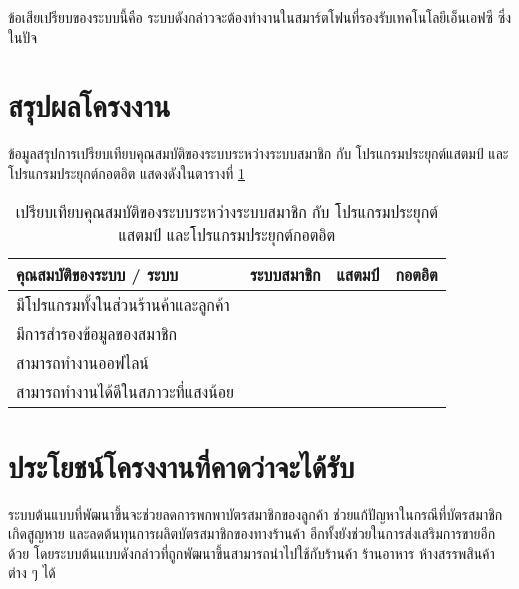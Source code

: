 \documentclass[a4paper]{article}
\newcommand{\cmark}{\ding{51}}
\newcommand{\xmark}{\ding{55}}
\begin{document}
ข้อเสียเปรียบของระบบนี้คือ ระบบดังกล่าวจะต้องทำงานในสมาร์ตโฟนที่รองรับเทคโนโลยีเอ็นเอฟซี ซึ่งในปัจ
\section{สรุปผลโครงงาน}
ข้อมูลสรุปการเปรียบเทียบคุณสมบัติของระบบระหว่างระบบสมาชิก กับ โปรแกรมประยุกต์แสตมป์ และโปรแกรมประยุกต์กอตอิต แสดงดังในตารางที่ \ref{tab:compare_feature}

\begin{table}[ht!]
\centering
\resizebox{81mm}{!} {
\begin{tabular}{ | l | c | c | c |}
	\hline                        
  	คุณสมบัติของระบบ / ระบบ            	& ระบบสมาชิก & แสตมป์ & กอตอิต \\
  	\hline 
  	มีโปรแกรมทั้งในส่วนร้านค้าและลูกค้า 	& \cmark & \xmark & \xmark \\
  	\hline
  	มีการสำรองข้อมูลของสมาชิก			& \cmark & \cmark & \cmark \\
  	\hline
  	สามารถทำงานออฟไลน์                 	& \cmark & \cmark & \cmark \\
  	\hline
  	สามารถทำงานได้ดีในสภาวะที่แสงน้อย    	& \cmark & \cmark & \xmark \\
  	\hline
\end{tabular}
}
\caption{เปรียบเทียบคุณสมบัติของระบบระหว่างระบบสมาชิก กับ โปรแกรมประยุกต์แสตมป์ และโปรแกรมประยุกต์กอตอิต}
\label{tab:compare_feature}
\end{table}

\section{ประโยชน์โครงงานที่คาดว่าจะได้รับ}
ระบบต้นแบบที่พัฒนาขึ้นจะช่วยลดการพกพาบัตรสมาชิกของลูกค้า ช่วยแก้ปัญหาในกรณีที่บัตรสมาชิกเกิดสูญหาย และลดต้นทุนการผลิตบัตรสมาชิกของทางร้านค้า อีกทั้งยังช่วยในการส่งเสริมการขายอีกด้วย โดยระบบต้นแบบดังกล่าวที่ถูกพัฒนาขึ้นสามารถนำไปใช้กับร้านค้า ร้านอาหาร ห้างสรรพสินค้าต่าง ๆ ได้
\end{document}
